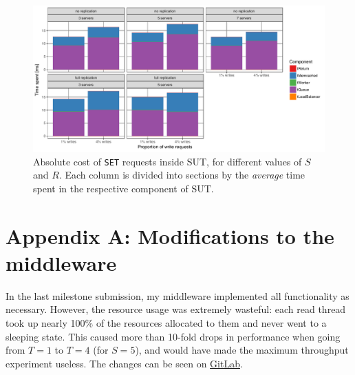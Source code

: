 \documentclass[11pt]{article}
\newcommand{\set}[0]{\texttt{SET}}
\begin{document}
\begin{figure}[h]
\centering
\includegraphics[width=\textwidth]{../results/writes/graphs/time_breakdown_vs_writes_set_abs.pdf}
\caption{Absolute cost of \set{} requests inside SUT, for different values of $S$ and $R$. Each column is divided into sections by the \emph{average} time spent in the respective component of SUT.}
\label{fig:exp3:res:breakdown:set:abs}
\end{figure}



\clearpage

\section*{Appendix A: Modifications to the middleware}
\label{sec:appa}

In the last milestone submission, my middleware implemented all functionality as necessary. However, the resource usage was extremely wasteful: each read thread took up nearly 100\% of the resources allocated to them and never went to a sleeping state. This caused more than 10-fold drops in performance when going from $T=1$ to $T=4$ (for $S=5$), and would have made the maximum throughput experiment useless. The changes can be seen on \href{https://gitlab.inf.ethz.ch/pungast/asl-fall16-project/commit/928e9bba132d34ecf9c00936babdd7fa2645e50f}{GitLab}.
\end{document}
